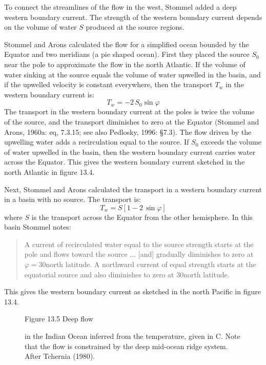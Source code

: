 To connect the streamlines of the flow in the west, Stommel added a
deep western boundary current. The strength of the western boundary
current depends on the volume of water $S$ produced at the source
regions.

Stommel and Arons calculated the flow for a simplified ocean bounded
by the Equator and two meridians (a pie shaped ocean). First they
placed the source $S_0$ near the pole to approximate the flow in the
north Atlantic. If the volume of water sinking at the source equals
the volume of water upwelled in the basin, and if the upwelled
velocity is constant everywhere, then the transport $T_w$ in the western boundary current is:
\begin{equation}
T_w = -2\,S_0 \sin \varphi
\end{equation}
The transport in the western boundary current at the poles is twice
the volume of the source, and the transport diminishes to zero at the
Equator (Stommel and Arons, 1960a: eq, 7.3.15; see also Pedlosky,
1996: \S 7.3). The flow driven by the upwelling water adds a recirculation equal to the source. If
$S_0$ exceeds the volume of water upwelled in the basin, then the
western boundary current carries water across the Equator. This gives
the western boundary current sketched in the north Atlantic in figure
13.4.

Next, Stommel and Arons calculated the
transport in a
western boundary current in a basin with no source. The transport is:
\begin{equation}
T_w = S \left[ 1 - 2 \, \sin \varphi \right]
\end{equation}
where $S$ is the transport across the
Equator from the other hemisphere. In this basin Stommel notes:
\begin{quote} \small
A current of recirculated water equal to the source strength starts at
the pole and flows toward the source $\ldots$ [and] gradually
diminishes to zero at $\varphi = 30$\degrees north latitude. A
northward current of equal strength starts at the equatorial source
and also diminishes to zero at 30\degrees north latitude.
\end{quote}
This gives the western boundary current as sketched in the north
Pacific in figure 13.4.

\begin{figure}[t!]
\centering
{}
\footnotesize
Figure 13.5 Deep flow\rule{0mm}{3ex} in the Indian Ocean inferred from
the temperature, given in \degrees C. Note that the flow is
constrained by the deep mid-ocean ridge system.  After Tchernia
(1980).
\label{fig:deepindian}
\vspace{-3ex}
\end{figure}

